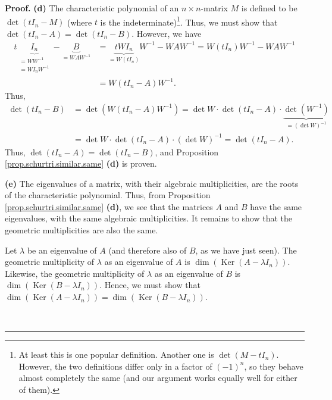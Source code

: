 \documentclass[numbers=enddot,12pt,final,onecolumn,notitlepage]{scrartcl}%
\numberwithin{exer}{subsection}
\theoremstyle{definition}
\newenvironment{proof}[1][Proof]{\noindent\textbf{#1.} }{\ \rule{0.5em}{0.5em}}
\begin{document}
\begin{proof}
\textbf{(d)} The characteristic polynomial of an $n\times n$-matrix $M$ is
defined to be $\det\left(  tI_{n}-M\right)  $ (where $t$ is the
indeterminate)\footnote{At least this is one popular definition. Another one
is $\det\left(  M-tI_{n}\right)  $. However, the two definitions differ only
in a factor of $\left(  -1\right)  ^{n}$, so they behave almost completely the
same (and our argument works equally well for either of them).}. Thus, we must
show that $\det\left(  tI_{n}-A\right)  =\det\left(  tI_{n}-B\right)  $.
However, we have%
\begin{align*}
t\underbrace{I_{n}}_{\substack{=WW^{-1}\\=WI_{n}W^{-1}}}-\underbrace{B}%
_{=WAW^{-1}}  &  =\underbrace{tWI_{n}}_{=W\left(  tI_{n}\right)  }%
W^{-1}-WAW^{-1}=W\left(  tI_{n}\right)  W^{-1}-WAW^{-1}\\
&  =W\left(  tI_{n}-A\right)  W^{-1}.
\end{align*}
Thus,%
\begin{align*}
\det\left(  tI_{n}-B\right)   &  =\det\left(  W\left(  tI_{n}-A\right)
W^{-1}\right)  =\det W\cdot\det\left(  tI_{n}-A\right)  \cdot\underbrace{\det
\left(  W^{-1}\right)  }_{=\left(  \det W\right)  ^{-1}}\\
&  =\det W\cdot\det\left(  tI_{n}-A\right)  \cdot\left(  \det W\right)
^{-1}=\det\left(  tI_{n}-A\right)  .
\end{align*}
Thus, $\det\left(  tI_{n}-A\right)  =\det\left(  tI_{n}-B\right)  $, and
Proposition \ref{prop.schurtri.similar.same} \textbf{(d)} is proven.

\textbf{(e)} The eigenvalues of a matrix, with their algebraic multiplicities,
are the roots of the characteristic polynomial. Thus, from Proposition
\ref{prop.schurtri.similar.same} \textbf{(d)}, we see that the matrices $A$
and $B$ have the same eigenvalues, with the same algebraic multiplicities. It
remains to show that the geometric multiplicities are also the same.

Let $\lambda$ be an eigenvalue of $A$ (and therefore also of $B$, as we have
just seen). The geometric multiplicity of $\lambda$ as an eigenvalue of $A$ is
$\dim\left(  \operatorname*{Ker}\left(  A-\lambda I_{n}\right)  \right)  $.
Likewise, the geometric multiplicity of $\lambda$ as an eigenvalue of $B$ is
$\dim\left(  \operatorname*{Ker}\left(  B-\lambda I_{n}\right)  \right)  $.
Hence, we must show that $\dim\left(  \operatorname*{Ker}\left(  A-\lambda
I_{n}\right)  \right)  =\dim\left(  \operatorname*{Ker}\left(  B-\lambda
I_{n}\right)  \right)  $.


\end{proof}
\end{document}
